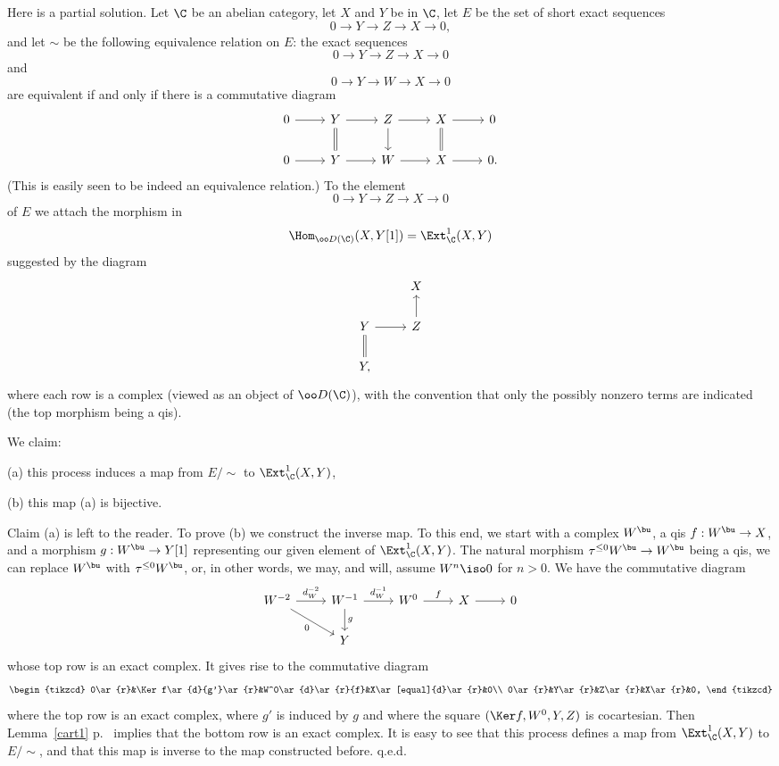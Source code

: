 \documentclass[12pt]{article}
\theoremstyle{remark}
\theoremstyle{definition}
\begin{document}
Here is a partial solution. Let $\C$ be an abelian category, let $X$ and $Y$ be in $\C$, let $E$ be the set of short exact sequences 
$$
0\to Y\to Z\to X\to0,
$$ 
and let $\sim$ be the following equivalence relation on $E$: the exact sequences 
$$
0\to Y\to Z\to X\to0
$$ 
and 
$$
0\to Y\to W\to X\to0
$$ 
are equivalent if and only if there is a commutative diagram 
$$
\begin{tikzcd}
0\ar{r}&Y\ar[equal]{d}\ar{r}&Z\ar{d}\ar{r}&X\ar[equal]{d}\ar{r}&0\\ 
0\ar{r}&Y\ar{r}&W\ar{r}&X\ar{r}&0.
\end{tikzcd}
$$ 
(This is easily seen to be indeed an equivalence relation.) To the element 
$$
0\to Y\to Z\to X\to0
$$ 
of $E$ we attach the morphism in 
$$
\Hom_{\oo D(\C)}(X,Y[1])=\Ext^1_\C(X,Y)
$$ 
suggested by the diagram 
$$
\begin{tikzcd}
{}&X\\ 
Y\ar[equal]{d}\ar{r}&Z\ar{u}\\ 
Y,
\end{tikzcd}
$$ 
where each row is a complex (viewed as an object of $\oo D(\C)$), with the convention that only the possibly nonzero terms are indicated (the top morphism being a qis). 

We claim: 

(a) this process induces a map from $E/\!\!\sim$ to $\Ext^1_\C(X,Y)$, 

(b) this map (a) is bijective. 

Claim (a) is left to the reader. To prove (b) we construct the inverse map. To this end, we start with a complex $W^\bu$, a qis $f:W^\bu\to X$, and a morphism $g:W^\bu\to Y[1]$ representing our given element of $\Ext^1_\C(X,Y)$. The natural morphism $\tau^{\le0}W^\bu\to W^\bu$ being a qis, we can replace $W^\bu$ with $\tau^{\le0}W^\bu$, or, in other words, we may, and will, assume $W^n\iso0$ for $n>0$. We have the commutative diagram 
$$
\begin{tikzcd}
W^{-2}\ar[dr,"0"']\ar[r,"d_W^{-2}"]&W^{-1}\ar[d,"g"]\ar[r,"d_W^{-1}"]&W^0\ar[r,"f"]&X\ar[r]&0\\ 
&Y
\end{tikzcd}
$$ 
whose top row is an exact complex. It gives rise to the commutative diagram 
$$
\begin{tikzcd}
0\ar{r}&\Ker f\ar{d}{g'}\ar{r}&W^0\ar{d}\ar{r}{f}&X\ar[equal]{d}\ar{r}&0\\ 
0\ar{r}&Y\ar{r}&Z\ar{r}&X\ar{r}&0,
\end{tikzcd}
$$ 
where the top row is an exact complex, where $g'$ is induced by $g$ and where the square $(\Ker f,W^0,Y,Z)$ is cocartesian. Then Lemma~\ref{cart1} p.~ %
implies that the bottom row is an exact complex. It is easy to see that this process defines a map from $\Ext^1_\C(X,Y)$ to $E/\!\!\sim$, and that this map is inverse to the map constructed before. q.e.d.
\end{document}
